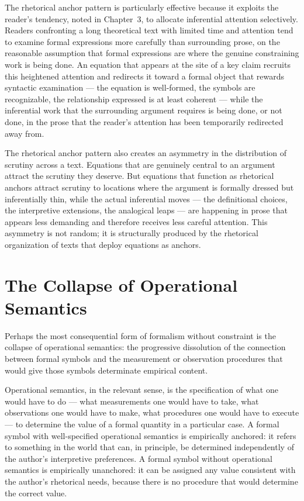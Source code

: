\documentclass[12pt, openright, twoside]{book}
\begin{document}
The rhetorical anchor pattern is particularly effective because
it exploits the reader's tendency, noted in Chapter~3, to
allocate inferential attention selectively. Readers confronting
a long theoretical text with limited time and attention tend
to examine formal expressions more carefully than surrounding
prose, on the reasonable assumption that formal expressions
are where the genuine constraining work is being done. An
equation that appears at the site of a key claim recruits this
heightened attention and redirects it toward a formal object
that rewards syntactic examination --- the equation is
well-formed, the symbols are recognizable, the relationship
expressed is at least coherent --- while the inferential work
that the surrounding argument requires is being done, or not
done, in the prose that the reader's attention has been
temporarily redirected away from.

The rhetorical anchor pattern also creates an asymmetry in
the distribution of scrutiny across a text. Equations that
are genuinely central to an argument attract the scrutiny
they deserve. But equations that function as rhetorical anchors
attract scrutiny to locations where the argument is formally
dressed but inferentially thin, while the actual inferential
moves --- the definitional choices, the interpretive extensions,
the analogical leaps --- are happening in prose that appears
less demanding and therefore receives less careful attention.
This asymmetry is not random; it is structurally produced by
the rhetorical organization of texts that deploy equations
as anchors.

\section{The Collapse of Operational Semantics}

Perhaps the most consequential form of formalism without
constraint is the collapse of operational semantics: the
progressive dissolution of the connection between formal
symbols and the measurement or observation procedures that
would give those symbols determinate empirical content.

Operational semantics, in the relevant sense, is the
specification of what one would have to do --- what
measurements one would have to take, what observations one
would have to make, what procedures one would have to execute
--- to determine the value of a formal quantity in a particular
case. A formal symbol with well-specified operational semantics
is empirically anchored: it refers to something in the world
that can, in principle, be determined independently of the
author's interpretive preferences. A formal symbol without
operational semantics is empirically unanchored: it can be
assigned any value consistent with the author's rhetorical
needs, because there is no procedure that would determine
the correct value.
\end{document}
